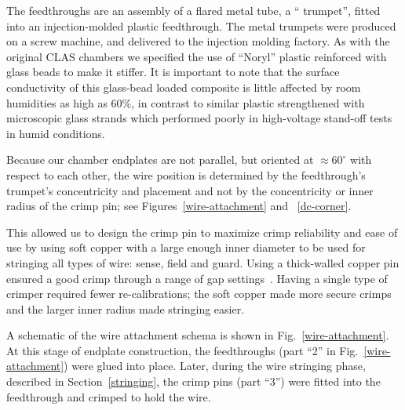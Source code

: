 The feedthroughs are an assembly of a flared metal tube, a `` trumpet'', fitted into an injection-molded 
plastic feedthrough.  The metal trumpets were produced on a screw machine, and 
delivered to the injection molding factory.
As with the original CLAS chambers we specified the use of
``Noryl'' plastic reinforced with glass beads to make it stiffer.
It is important to note that the surface conductivity
of this glass-bead loaded composite is little affected by room humidities
as high as 60\%, in contrast to similar plastic strengthened
with microscopic glass strands which performed poorly in high-voltage stand-off
tests in humid conditions.  

Because our chamber endplates are not parallel, but oriented at
$\approx 60^{\circ}$ with respect to each other, the wire position is determined
by the feedthrough's trumpet's concentricity and placement and not by
the concentricity or inner radius of the crimp pin; see Figures~\ref{wire-attachment} and ~\ref{dc-corner}.

This allowed us to design the crimp pin to maximize crimp reliability
and ease of use by using soft copper with a large enough inner diameter
to be used for stringing all types of wire: sense, field and guard.
Using a thick-walled copper pin ensured a good crimp through a range of gap settings~\cite{sbc}.
Having a single type of crimper required fewer re-calibrations; the soft
copper made more secure crimps and the larger inner radius made
stringing easier.

 A schematic of the wire attachment schema is shown in
Fig.~\ref{wire-attachment}.  At this stage of endplate construction, the
feedthroughs (part ``2'' in Fig.~\ref{wire-attachment}) were glued into place.
Later, during the wire stringing phase, described in Section~\ref{stringing},
the crimp pins (part ``3'') were fitted into the feedthrough and crimped to
hold the wire.  

